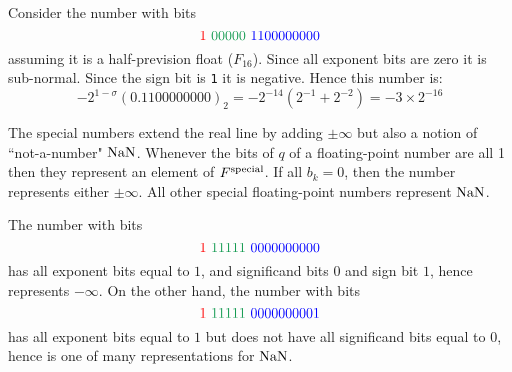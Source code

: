 \begin{example} Consider the number with bits
\[
\red{1}\ \green{00000}\ \blue{1100000000}
\]
assuming it is a half-prevision float ($F_{16}$).  Since all exponent bits are zero it is sub-normal. Since the sign bit is \texttt{1} it is negative.  Hence this number is:
\[
-2^{1-\ensuremath{\sigma}} (0.1100000000)_2 = -2^{-14} (2^{-1} + 2^{-2}) = -3 \ensuremath{\times} 2^{-16}
\]
\end{example}

The special numbers extend the real line by adding $\ensuremath{\pm}\ensuremath{\infty}$ but also a notion of ``not-a-number" ${\rm NaN}$. Whenever the bits of $q$ of a floating-point number are all 1 then they represent an element of $F^{\rm special}$. If all $b_k=0$, then the number represents either $\ensuremath{\pm}\ensuremath{\infty}$. All other special floating-point numbers represent ${\rm NaN}$. 

\begin{example} The number with bits
\[
\red{1}\ \green{11111}\ \blue{0000000000}
\]
has all exponent bits equal to $1$, and significand bits $0$ and sign bit $1$, hence represents $-\ensuremath{\infty}$. On the other hand, the number with bits
\[
\red{1}\ \green{11111}\ \blue{0000000001}
\]
has all exponent bits equal to $1$ but does not have all significand bits equal to $0$, hence is one of many representations for  ${\rm NaN}$. \end{example}



